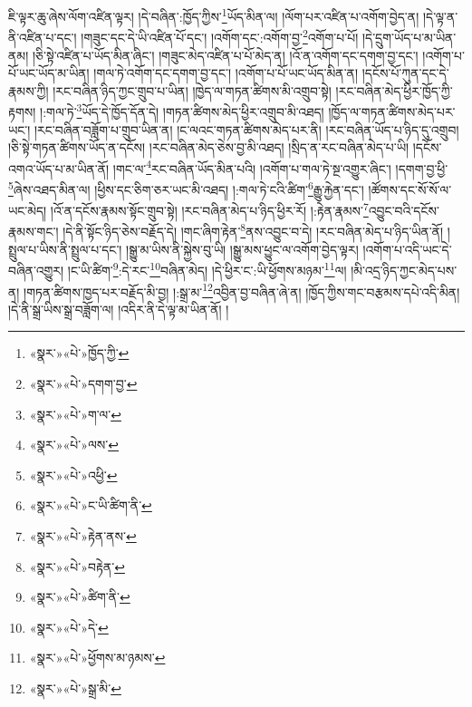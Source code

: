 ཇི་ལྟར་ཆུ་ཞེས་ལོག་འཛིན་ལྟར། །དེ་བཞིན་:ཁྱོད་ཀྱིས་\footnote{«སྣར་»«པེ་»ཁྱོད་ཀྱི་}ཡོད་མིན་ལ། །ལོག་པར་འཛིན་པ་འགོག་བྱེད་ན། །དེ་ལྟ་ན་ནི་འཛིན་པ་དང་། །གཟུང་དང་དེ་ཡི་འཛིན་པོ་དང་། །འགོག་དང་:འགོག་བྱ་\footnote{«སྣར་»«པེ་»དགག་བྱ་}འགོག་པ་པོ། །དེ་དྲུག་ཡོད་པ་མ་ཡིན་ནམ། །ཅི་སྟེ་འཛིན་པ་ཡོད་མིན་ཞིང་། །གཟུང་མེད་འཛིན་པ་པོ་མེད་ན། །འོ་ན་འགོག་དང་དགག་བྱ་དང་། །འགོག་པ་པོ་ཡང་ཡོད་མ་ཡིན། །གལ་ཏེ་འགོག་དང་དགག་བྱ་དང་། །འགོག་པ་པོ་ཡང་ཡོད་མིན་ན། །དངོས་པོ་ཀུན་དང་དེ་རྣམས་ཀྱི། །རང་བཞིན་ཉིད་ཀྱང་གྲུབ་པ་ཡིན། །ཁྱེད་ལ་གཏན་ཚིགས་མི་འགྲུབ་སྟེ། །རང་བཞིན་མེད་ཕྱིར་ཁྱོད་ཀྱི་རྟགས། །:གལ་ཏེ་\footnote{«སྣར་»«པེ་»ག་ལ་}ཡོད་དེ་ཁྱོད་དོན་དེ། །གཏན་ཚིགས་མེད་ཕྱིར་འགྲུབ་མི་འཐད། །ཁྱོད་ལ་གཏན་ཚིགས་མེད་པར་ཡང་། །རང་བཞིན་བཟློག་པ་གྲུབ་ཡིན་ན། །ང་ལའང་གཏན་ཚིགས་མེད་པར་ནི། །རང་བཞིན་ཡོད་པ་ཉིད་དུ་འགྲུབ། །ཅི་སྟེ་གཏན་ཚིགས་ཡོད་ན་དངོས། །རང་བཞིན་མེད་ཅེས་བྱ་མི་འཐད། །སྲིད་ན་རང་བཞིན་མེད་པ་ཡི། །དངོས་འགའ་ཡོད་པ་མ་ཡིན་ནོ། །གང་ལ་\footnote{«སྣར་»«པེ་»ལས་}རང་བཞིན་ཡོད་མིན་པའི། །འགོག་པ་གལ་ཏེ་སྔ་འགྱུར་ཞིང་། །དགག་བྱ་ཕྱི་\footnote{«སྣར་»«པེ་»འཕྱི་}ཞེས་འཐད་མིན་ལ། །ཕྱིས་དང་ཅིག་ཅར་ཡང་མི་འཐད། །:གལ་ཏེ་ངའི་ཚིག་\footnote{«སྣར་»«པེ་»ང་ཡི་ཚིག་ནི་}རྒྱུ་རྐྱེན་དང་། །ཚོགས་དང་སོ་སོ་ལ་ཡང་མེད། །འོ་ན་དངོས་རྣམས་སྟོང་གྲུབ་སྟེ། །རང་བཞིན་མེད་པ་ཉིད་ཕྱིར་རོ། །:རྟེན་རྣམས་\footnote{«སྣར་»«པེ་»རྟེན་ནས་}འབྱུང་བའི་དངོས་རྣམས་གང་། །དེ་ནི་སྟོང་ཉིད་ཅེས་བརྗོད་དེ། །གང་ཞིག་རྟེན་\footnote{«སྣར་»«པེ་»བརྟེན་}ནས་འབྱུང་བ་དེ། །རང་བཞིན་མེད་པ་ཉིད་ཡིན་ནོ། །སྤྲུལ་པ་ཡིས་ནི་སྤྲུལ་པ་དང་། །སྒྱུ་མ་ཡིས་ནི་སྐྱེས་བུ་ཡི། །སྒྱུ་མས་ཕྱུང་ལ་འགོག་བྱེད་ལྟར། །འགོག་པ་འདི་ཡང་དེ་བཞིན་འགྱུར། །ང་ཡི་ཚིག་\footnote{«སྣར་»«པེ་»ཚིག་ནི་}:དེ་རང་\footnote{«སྣར་»«པེ་»དེ་}བཞིན་མེད། །དེ་ཕྱིར་ང་:ཡི་ཕྱོགས་མཉམ་\footnote{«སྣར་»«པེ་»ཕྱོགས་མ་ཉམས་}ལ། །མི་འདྲ་ཉིད་ཀྱང་མེད་པས་ན། །གཏན་ཚིགས་ཁྱད་པར་བརྗོད་མི་བྱ། །:སྒྲ་མ་\footnote{«སྣར་»«པེ་»སྒྲ་མི་}འབྱིན་བྱ་བཞིན་ཞེ་ན། །ཁྱོད་ཀྱིས་གང་བརྩམས་དཔེ་འདི་མིན། །དེ་ནི་སྒྲ་ཡིས་སྒྲ་བཟློག་ལ། །འདིར་ནི་དེ་ལྟ་མ་ཡིན་ནོ། །
